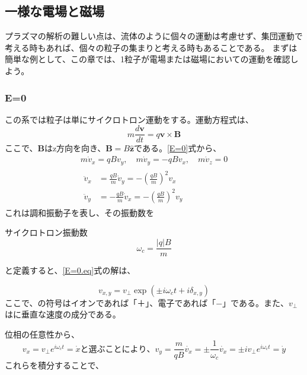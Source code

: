 \documentclass{ltjsarticle}
\numberwithin{equation}{section} %
\begin{document}
\subsection{一様な電場と磁場}
プラズマの解析の難しい点は、流体のように個々の運動は考慮せず、集団運動で考える時もあれば、個々の粒子の集まりと考える時もあることである。
まずは簡単な例として、この章では、1粒子が電場または磁場においての運動を確認しよう。

\subsubsection{E=0}
この系では粒子は単にサイクロトロン運動をする。運動方程式は、
\begin{equation}
  m\frac{d\bm{v}}{dt} = q\bm{v}\times \bm{B} \label{E=0}
\end{equation}
ここで、$\bm{B}$はz方向を向き、$\bm{B}=B\bm{\hat{z}}$である。\eqref{E=0}式から、
\begin{equation}
\begin{gathered}
  m\dot{v}_x = qB v_y, \quad
  m\dot{v}_y = -qB v_x, \quad
  m\dot{v}_z = 0 \\
  \begin{aligned}
    \ddot{v}_x &= \frac{qB}{m}\dot{v}_y = -\left(\frac{qB}{m}\right)^2 v_x \\
    \ddot{v}_y &= -\frac{qB}{m}\dot{v}_x = -\left(\frac{qB}{m}\right)^2 v_y \label{E=0.eq}
  \end{aligned}
\end{gathered}
\end{equation} 
これは調和振動子を表し、その振動数を

\begin{eqbox}{サイクロトロン振動数}
\begin{equation}
  \omega_c = \frac{|q|B}{m} \label{cyclon}
\end{equation}
\end{eqbox}  
と定義すると、\eqref{E=0.eq}式の解は、

\[
v_{x,y} = v_\perp \exp(\pm i\omega_ct + i\delta_{x,y})
\]
ここで、\pm の符号はイオンであれば「＋」、電子であれば「−」である。また、$v_\perp$はに垂直な速度の成分である。

位相の任意性から、
\begin{subequations}
  \begin{equation}
    v_x = v_\perp e^{i\omega_c t} = \dot{x} \label{normal.x}
  \end{equation}
と選ぶことにより、
  \begin{equation}
    v_y = \frac{m}{qB}\dot{v_x} = \pm \frac{1}{\omega_c}\dot{v_x} = \pm iv_\perp e^{i\omega_c t} = \dot{y} \label{normal.y}
  \end{equation}
\end{subequations}
これらを積分することで、
\end{document}
